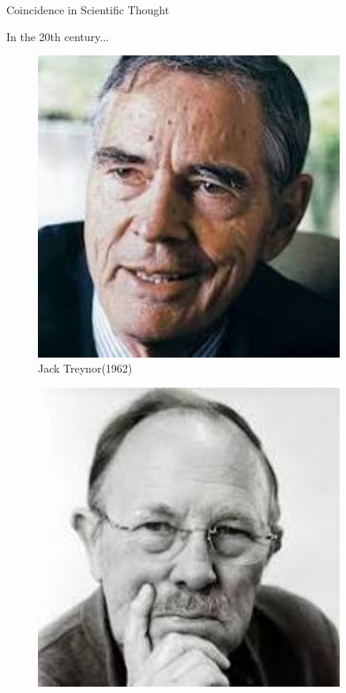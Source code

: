 \documentclass{beamer}
\begin{document}
\begin{frame}{Coincidence in Scientific Thought}
	\begin{block}{In the 20th century...}
	\begin{figure}
		\begin{minipage}[t]{0.24\textwidth}
			\centering
			\includegraphics[width=0.9\textwidth]{Jack.jpg}\\
			Jack Treynor(1962)
		\end{minipage}
		\begin{minipage}[t]{0.24\textwidth}
			\centering
			\includegraphics[width=0.9\textwidth]{William.jpg}\\

\end{minipage}
\end{figure}
\end{block}
\end{frame}
\end{document}
